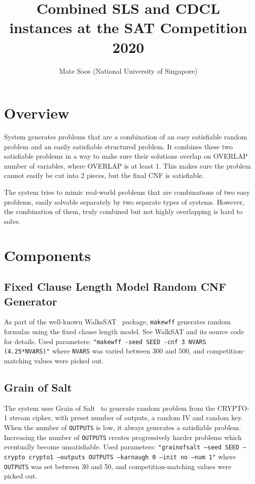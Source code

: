 \documentclass[final]{ieee}
\begin{document}
\title{Combined SLS and CDCL instances at the SAT Competition 2020}
\author{Mate Soos (National University of Singapore)}

\maketitle
\thispagestyle{empty}
\pagestyle{empty}



\section{Overview}
System generates problems that are a combination of an easy satisfiable random problem and an easily satisfiable structured problem. It combines these two satisfiable problems in a way to make sure their solutions overlap on OVERLAP number of variables, where OVERLAP is at least 1. This makes sure the problem cannot easily be cut into 2 pieces, but the final CNF is satisfiable.

The system tries to mimic real-world problems that are combinations of two easy problems, easily solvable separately by two separate types of systems. However, the combination of them, truly combined but not highly overlapping is hard to solve.


\section{Components}


\subsection{Fixed Clause Length Model Random CNF Generator}

As part of the well-known WalksSAT~\cite{Selman95localsearch} package, \texttt{makewff} generates random formulas using the fixed clause length model. See WalkSAT and its source code for details. Used parameters: \texttt{"makewff -seed SEED -cnf 3 NVARS (4.25*NVARS)"} where \texttt{NVARS} was varied between 300 and 500, and competition-matching values were picked out.

\subsection{Grain of Salt}
The system uses Grain of Salt~\cite{soos2010grain} to generate random problem from the CRYPTO-1 stream cipher, with preset number of outputs, a random IV and random key. When the number of \texttt{OUTPUTS} is low, it always generates a satisfiable problem. Increasing the number of \texttt{OUTPUTS} creates progressively harder problems which eventually become unsatisfiable. Used parameters: \texttt{"grainofsalt --seed SEED --crypto crypto1 --outputs OUTPUTS --karnaugh 0 --init no --num 1"} where \texttt{OUTPUTS} was set between 30 and 50, and competition-matching values were picked out.
\end{document}
